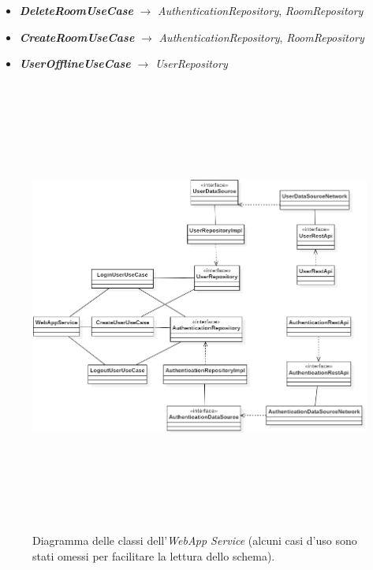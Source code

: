 \begin{itemize}
    \item \textit{\textbf{DeleteRoomUseCase}} $\longrightarrow$ \textit{AuthenticationRepository}, \textit{RoomRepository}
    
    \item \textit{\textbf{CreateRoomUseCase}} $\longrightarrow$
    \textit{AuthenticationRepository}, \textit{RoomRepository}
    
    \item \textit{\textbf{UserOfflineUseCase}} $\longrightarrow$ \textit{UserRepository}
\end{itemize}

\begin{figure}
  \centering
  \includegraphics[height=15cm, width=12cm,
		keepaspectratio]{images/WepAppServiceClassDiagram.png}
  \caption{Diagramma delle classi dell'\textit{WebApp Service} (alcuni casi d'uso sono stati omessi per facilitare la lettura dello schema).}
  \label{fig:webapp-service-class-diagram}
\end{figure}

